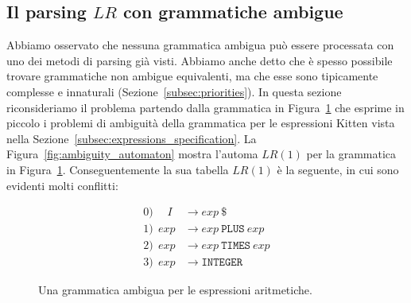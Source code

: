 \subsection{Il parsing $\mathit{LR}$ con grammatiche ambigue}
  \label{subsec:ambiguity}
%
Abbiamo osservato che nessuna grammatica ambigua pu\`o essere
processata con uno dei metodi di parsing gi\`a visti. Abbiamo anche
detto che \`e spesso possibile trovare grammatiche non ambigue
equivalenti, ma che esse sono tipicamente complesse e innaturali
(Sezione~\ref{subsec:priorities}). In questa sezione riconsideriamo il
problema partendo dalla grammatica in Figura~\ref{fig:expressions_ambiguity}
che esprime in piccolo i problemi di ambiguit\`a della grammatica per le
espressioni Kitten vista nella Sezione~\ref{subsec:expressions_specification}.
La Figura~\ref{fig:ambiguity_automaton} mostra l'automa
$\mathit{LR}(1)$ per la grammatica in Figura~\ref{fig:expressions_ambiguity}.
Conseguentemente la sua tabella $\mathit{LR}(1)$ \`e la seguente, in cui
sono evidenti molti conflitti:
%
\begin{figure}[t]
\begin{align*}
  0)\ \ \ \ \ \,I &\to \mathit{exp}\ \mathtt{\$}\\
  1)\ \ \mathit{exp} &\to\mathit{exp}\ \mathtt{PLUS}\ \mathit{exp}\\
  2)\ \ \mathit{exp} &\to \mathit{exp}\ \mathtt{TIMES}\ \mathit{exp}\\
  3)\ \ \mathit{exp} &\to \mathtt{INTEGER}
\end{align*}
\caption{Una grammatica ambigua per le espressioni aritmetiche.}
  \label{fig:expressions_ambiguity}
\end{figure}
%
